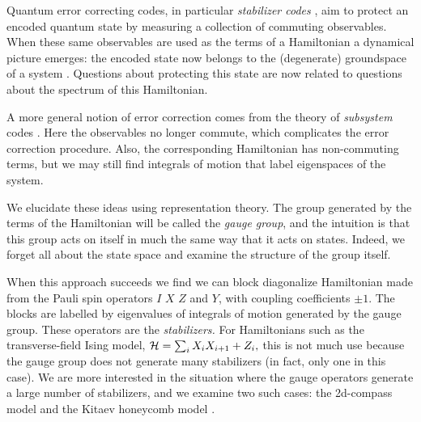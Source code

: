 \documentclass[12pt,notitlepage,longbibliography,nofootinbib,tightenlines]{revtex4}
\begin{document}
Quantum error correcting codes,
in particular {\it stabilizer codes} \cite{Gottesman1997},
aim to protect an encoded quantum state
by measuring a collection of commuting
observables.
When these same observables are used as
the terms of a Hamiltonian 
a dynamical picture emerges: the
encoded state now belongs to the
(degenerate) groundspace of a
system \cite{Dennis2001}. 
Questions about protecting
this state are now related to questions about
the spectrum of this Hamiltonian.

A more general notion of error correction
comes from the theory of 
{\it subsystem} codes \cite{Poulin2005}. 
Here the observables
no longer commute, which complicates
the error correction procedure.
Also, the corresponding Hamiltonian
has non-commuting terms, but
we may still find integrals of
motion that label eigenspaces
of the system.

We elucidate these ideas using representation theory. 
The group generated by the terms of the Hamiltonian
will be called the {\it gauge group},
and the intuition is that this
group acts on itself in much the same way
that it acts on states. 
Indeed, we forget all about the state space and
examine the structure of the group itself.

When this approach succeeds we find we can
block diagonalize Hamiltonian made from 
the Pauli spin operators
$I$ $X$ $Z$ and $Y$, with coupling coefficients
$\pm 1.$
The blocks are labelled by eigenvalues of
integrals of motion generated by the gauge
group. These operators are the {\it stabilizers.}
For Hamiltonians such as
the transverse-field Ising model,
$\mathcal{H} = \sum_i X_i X_{i+1} + Z_i,$
this is not much use because the 
gauge group does not generate many
stabilizers (in fact, only one in this case).
We are more interested in the situation
where the gauge operators generate a large 
number of stabilizers, and we examine two
such cases: the 2d-compass model \cite{Bacon2006} and
the Kitaev honeycomb model \cite{Kitaev2006}.
\end{document}
